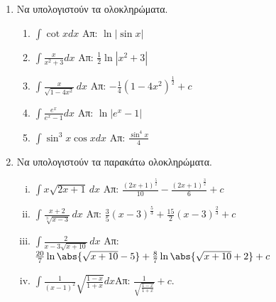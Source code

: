 \begin{enumerate}
\item Να υπολογιστούν τα ολοκληρώματα.

\begin{enumerate}
\item $\int \cot x dx$ \hfill Απ: $\ln|\sin x|$
\item $\int\frac{x}{x^2+3}dx$ \hfill Απ: $\frac{1}{2}\ln|x^2+3|$
\item $\int\frac{x}{\sqrt{1-4x^2}}\,dx$ \hfill Απ: $-\frac{1}{4}(1-4x^2)^{\frac{1}{2}}+c$
\item $\int \frac{e^x}{e^x-1}dx$ \hfill Απ: $\ln|e^x-1|$
\item $\int \sin^3x\cos x dx$ \hfill Απ: $\frac{\sin^4x}{4}$
\end{enumerate}

\item Να υπολογιστούν τα παρακάτω ολοκληρώματα.

\begin{enumerate}[i)]
\item $\int x\sqrt{2x+1}\,dx$ \hfill Απ: $\frac{(2x+1)^{\frac{5}{2}}}{10}-\frac{(2x+1)^{\frac{3}{2}}}{6}+c$
\item $\int\frac{x+2}{\sqrt[3]{x-3}}\,dx$ \hfill Απ: $\frac{3}{5}(x-3)^{\frac{5}{3}}+\frac{15}{2}(x-3)^{\frac{2}{3}}+c$
\item $\int\frac{2}{x-3\sqrt{x+10}}\,dx$ \hfill Απ: $\frac{20}{7}\ln\abs{\sqrt{x+10}-5}+\frac{8}{7}\ln\abs{\sqrt{x+10}+2}+c$
\item $\int\frac{1}{(x-1)^2}\sqrt{\frac{1-x}{1+x}}dx$\hfill Απ: $\frac{1}{\sqrt{\frac{1-x}{1+x}}}+c$.
\end{enumerate}

\end{enumerate}







